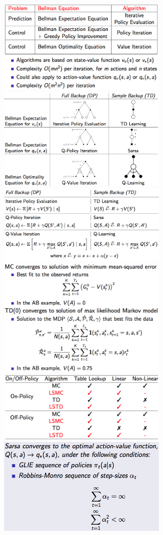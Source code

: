 \documentclass[10pt,landscape]{article}
\begin{document}
\begin{multicols}{3}
\includegraphics[width=8cm]{pics/vi_pe_pi_summary.png}
\includegraphics[width=8cm]{pics/DP-vs-TD_summary0.png}
\includegraphics[width=8cm]{pics/DP-vs-TD_summary1.png}
\includegraphics[width=8cm]{pics/td-vs-mc_convergence.png}
\includegraphics[width=8cm]{pics/ls_prediction_converg.png}
\includegraphics[width=8cm]{pics/sarsa_converg.png}

\end{multicols}
\end{document}
